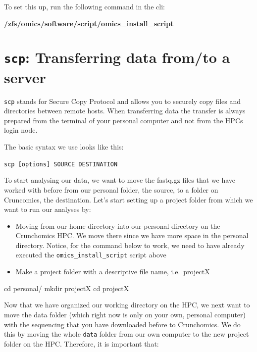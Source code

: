 \documentclass[
  letterpaper,
  DIV=11,
  numbers=noendperiod]{scrreprt}
\newenvironment{Shaded}{}{}
\newcommand{\BuiltInTok}[1]{\textcolor[rgb]{0.84,0.23,0.29}{#1}}
\newcommand{\ExtensionTok}[1]{\textcolor[rgb]{0.84,0.23,0.29}{\textbf{#1}}}
\newcommand{\FunctionTok}[1]{\textcolor[rgb]{0.44,0.26,0.76}{#1}}
\newcommand{\NormalTok}[1]{\textcolor[rgb]{0.14,0.16,0.18}{#1}}
\providecommand{\tightlist}{%
  \setlength{\itemsep}{0pt}\setlength{\parskip}{0pt}}\usepackage{longtable,booktabs,array}
\begin{document}
To set this up, run the following command in the cli:

\begin{Shaded}
\begin{Highlighting}[]
\ExtensionTok{/zfs/omics/software/script/omics\_install\_script}
\end{Highlighting}
\end{Shaded}

\section{\texorpdfstring{\texttt{scp}: Transferring data from/to a
server}{scp: Transferring data from/to a server}}\label{scp-transferring-data-fromto-a-server}

\texttt{scp} stands for Secure Copy Protocol and allows you to securely
copy files and directories between remote hosts. When transferring data
the transfer is always prepared from the terminal of your personal
computer and not from the HPCs login node.

The basic syntax we use looks like this:

\texttt{scp\ {[}options{]}\ SOURCE\ DESTINATION}

To start analysing our data, we want to move the fastq.gz files that we
have worked with before from our personal folder, the source, to a
folder on Cruncomics, the destination. Let's start setting up a project
folder from which we want to run our analyses by:

\begin{itemize}
\tightlist
\item
  Moving from our home directory into our personal directory on the
  Crunchomics HPC. We move there since we have more space in the
  personal directory. Notice, for the command below to work, we need to
  have already executed the \texttt{omics\_install\_script} script above
\item
  Make a project folder with a descriptive file name, i.e.~projectX
\end{itemize}

\begin{Shaded}
\begin{Highlighting}[]
\BuiltInTok{cd}\NormalTok{ personal/}
\FunctionTok{mkdir}\NormalTok{ projectX}
\BuiltInTok{cd}\NormalTok{ projectX}
\end{Highlighting}
\end{Shaded}

Now that we have organized our working directory on the HPC, we next
want to move the data folder (which right now is only on your own,
personal computer) with the sequencing that you have downloaded before
to Crunchomics. We do this by moving the whole \texttt{data} folder from
our own computer to the new project folder on the HPC. Therefore, it is
important that:
\end{document}
